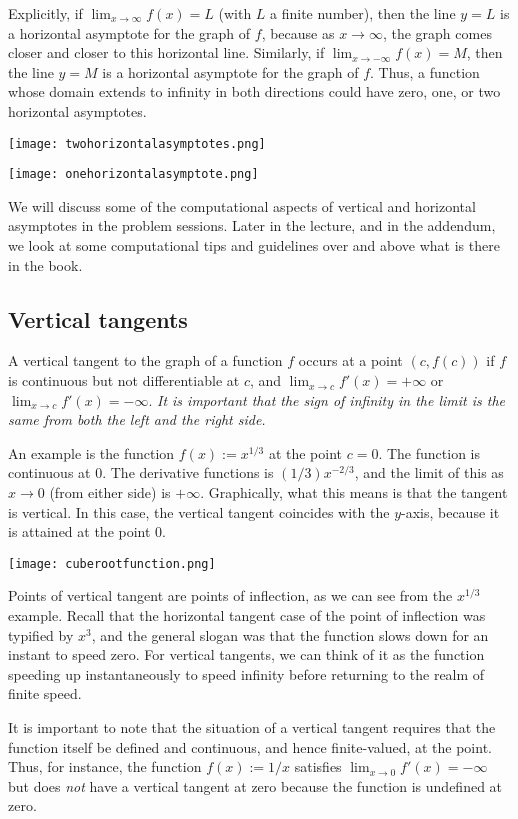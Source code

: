 \documentclass[10pt]{amsart}
\begin{document}
Explicitly, if $\lim_{x \to \infty} f(x) = L$ (with $L$ a finite
number), then the line $y = L$ is a horizontal asymptote for the graph
of $f$, because as $x \to \infty$, the graph comes closer and closer
to this horizontal line. Similarly, if $\lim_{x \to -\infty} f(x) =
M$, then the line $y = M$ is a horizontal asymptote for the graph of
$f$. Thus, a function whose domain extends to infinity in both
directions could have zero, one, or two horizontal asymptotes.

\texttt{[image: twohorizontalasymptotes.png]}

\texttt{[image: onehorizontalasymptote.png]}

We will discuss some of the computational aspects of vertical and
horizontal asymptotes in the problem sessions. Later in the lecture,
and in the addendum, we look at some computational tips and guidelines
over and above what is there in the book.

\subsection{Vertical tangents}

A vertical tangent to the graph of a function $f$ occurs at a point
$(c,f(c))$ if $f$ is continuous but not differentiable at $c$, and
$\lim_{x \to c} f'(x) = +\infty$ or $\lim_{x \to c} f'(x) =
-\infty$. {\em It is important that the sign of infinity in the limit
is the same from both the left and the right side.} 

An example is the function $f(x) := x^{1/3}$ at the point $c = 0$. The
function is continuous at $0$. The derivative functions is
$(1/3)x^{-2/3}$, and the limit of this as $x \to 0$ (from either side)
is $+\infty$. Graphically, what this means is that the tangent is
vertical. In this case, the vertical tangent coincides with the
$y$-axis, because it is attained at the point $0$.

\texttt{[image: cuberootfunction.png]}

Points of vertical tangent are points of inflection, as we can see
from the $x^{1/3}$ example. Recall that the horizontal tangent case of
the point of inflection was typified by $x^3$, and the general slogan
was that the function slows down for an instant to speed zero. For
vertical tangents, we can think of it as the function speeding up
instantaneously to speed infinity before returning to the realm of
finite speed.

It is important to note that the situation of a vertical tangent
requires that the function itself be defined and continuous, and hence
finite-valued, at the point. Thus, for instance, the function $f(x) :=
1/x$ satisfies $\lim_{x \to 0} f'(x) = -\infty$ but does {\em not}
have a vertical tangent at zero because the function is undefined at
zero.
\end{document}
